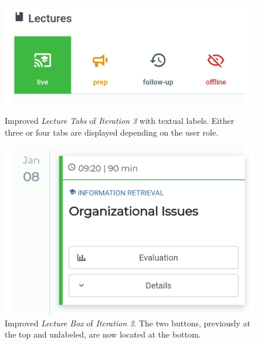 \begin{figure}
	\centering
	\begin{minipage}[t]{.5\textwidth}
		\centering
		\includegraphics[width=0.95\linewidth]{screenshots/redesign/lecture_tab_labels.jpg}
		\captionsetup{width=.8\linewidth}
		\caption{Improved \emph{Lecture Tabs} of \emph{Iteration 3} with textual labels. Either three or four tabs are displayed depending on the user role.}
		\label{fig:main_view_tab_labels}
	\end{minipage}%
	\begin{minipage}[t]{.5\textwidth}
		\centering
		\includegraphics[width=0.95\linewidth]{screenshots/redesign/main_view_it3_lecture_box.jpg}
		\captionsetup{width=.8\linewidth}
		\caption{Improved \emph{Lecture Box} of \emph{Iteration 3}. The two buttons, previously at the top and unlabeled, are now located at the bottom.}
		\label{fig:main_view_lecture_box_buttons}
	\end{minipage}
\end{figure}
